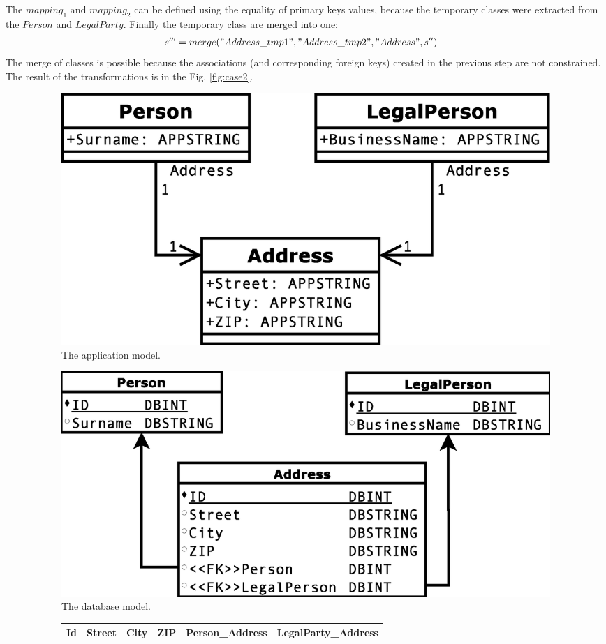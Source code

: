 \documentclass[runningheads]{comsis}
\begin{document}
The $mapping_1$ and $mapping_2$ can be defined using the equality of primary keys values, because the temporary classes were extracted from the $Person$ and $LegalParty$. Finally the temporary class are merged into one:
\begin{align}
 s''' &= merge("Address\_tmp1", "Address\_tmp2", "Address", s'')
\end{align}
The merge of classes is possible because the associations (and corresponding foreign keys) created in the previous step are not constrained. The result of the transformations is in the Fig. \ref{fig:case2}. 
\begin{figure}
\begin{subfigure}[b]{0.45\textwidth}
	\centering
	\includegraphics[width=\textwidth]{./images/case_app_9}
	\caption{The application model.}
\end{subfigure}
\quad
\begin{subfigure}[b]{0.45\textwidth}
	\centering
	\includegraphics[width=\textwidth]{./images/case_db_8}
	\caption{The database model.}
\end{subfigure}
\begin{subfigure}[b]{\textwidth}
	\centering
	\begin{tabular}{| c | l | l | l | l | l |}
	 	\hline
		Id & Street & City & ZIP & Person\_Address & LegalParty\_Address\\ \hline  

\end{tabular}
\end{subfigure}
\end{figure}
\end{document}
